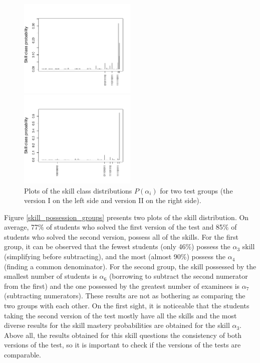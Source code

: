\documentclass[english]{pwr_wmat_praca_dyplomowa}
\theoremstyle{plain}
\theoremstyle{definition}
\numberwithin{theorem}{chapter}
\begin{document}
\begin{figure}[!ht]
	\centering
	\begin{multicols}{2}
		\includegraphics[width=0.5\textwidth]{Skill_class_probability_1.pdf}
		
		\includegraphics[width=0.5\textwidth]{Skill_class_probability_2.pdf}
	\end{multicols} 
	\caption{Plots of the skill class distributions $P(\alpha_i)$ for two test groups (the version I on the left side and version II on the right side).}\label{skill_class_dist_groups}
\end{figure}

Figure \ref{skill_possession_groups} presents two plots of the skill distribution. On average, 77\% of students who solved the first version of the test and 85\% of students who solved the second version, possess all of the skills. For the first group, it can be observed that the fewest students (only 46\%) possess the $\alpha_3$ skill (simplifying before subtracting), and the most (almost 90\%) possess the $\alpha_4$ (finding a common denominator). For the second group, the skill possessed by the smallest number of students is $\alpha_6$ (borrowing to subtract the second numerator from the first) and the one possessed by the greatest number of examinees is $\alpha_7$ (subtracting numerators). These results are not as bothering as comparing the two groups with each other. On the first sight, it is noticeable that the students taking the second version of the test mostly have all the skills and the most diverse results for the skill mastery probabilities are obtained for the skill $\alpha_3$. Above all, the results obtained for this skill questions the consistency of both versions of the test, so it is important to check if the versions of the tests are comparable.
\end{document}
